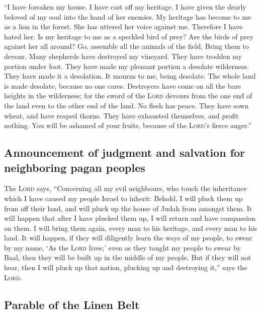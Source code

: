  ``I have forsaken my house. I have cast off my heritage.
I have given the dearly beloved of my soul into the hand of her enemies.
 My heritage has become to me as a lion in the forest. She
has uttered her voice against me. Therefore I have hated her.
 Is my heritage to me as a speckled bird of prey? Are the
birds of prey against her all around? Go, assemble all the animals of
the field. Bring them to devour.  Many shepherds have
destroyed my vineyard. They have trodden my portion under foot. They
have made my pleasant portion a desolate wilderness. 
They have made it a desolation. It mourns to me, being desolate. The
whole land is made desolate, because no one cares. 
Destroyers have come on all the bare heights in the wilderness; for the
sword of the \textsc{Lord} devours from the one end of the land even to
the other end of the land. No flesh has peace.  They have
sown wheat, and have reaped thorns. They have exhausted themselves, and
profit nothing. You will be ashamed of your fruits, because of the
\textsc{Lord}'s fierce anger.''

\hypertarget{announcement-of-judgment-and-salvation-for-neighboring-pagan-peoples}{%
\subsection{Announcement of judgment and salvation for neighboring pagan
peoples}\label{announcement-of-judgment-and-salvation-for-neighboring-pagan-peoples}}

 The \textsc{Lord} says, ``Concerning all my evil
neighbours, who touch the inheritance which I have caused my people
Israel to inherit: Behold, I will pluck them up from off their land, and
will pluck up the house of Judah from amongst them.  It
will happen that after I have plucked them up, I will return and have
compassion on them. I will bring them again, every man to his heritage,
and every man to his land.  It will happen, if they will
diligently learn the ways of my people, to swear by my name, `As the
\textsc{Lord} lives;' even as they taught my people to swear by Baal,
then they will be built up in the middle of my people. 
But if they will not hear, then I will pluck up that nation, plucking up
and destroying it,'' says the \textsc{Lord}.

\hypertarget{parable-of-the-linen-belt}{%
\subsection{Parable of the Linen Belt}\label{parable-of-the-linen-belt}}

